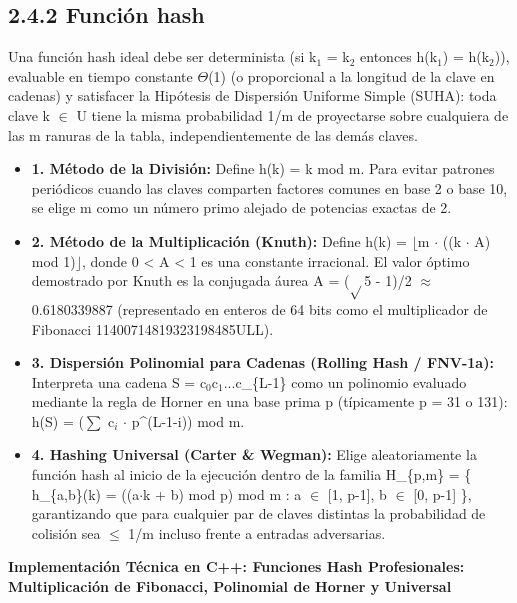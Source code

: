 \documentclass[11pt,letterpaper]{article}
\begin{document}
\subsection*{2.4.2 Función hash}
Una función hash ideal debe ser determinista (si k$_1$ = k$_2$ entonces h(k$_1$) = h(k$_2$)), evaluable en tiempo constante $\Theta$(1) (o proporcional a la longitud de la clave en cadenas) y satisfacer la Hipótesis de Dispersión Uniforme Simple (SUHA): toda clave k $\in$ U tiene la misma probabilidad 1/m de proyectarse sobre cualquiera de las m ranuras de la tabla, independientemente de las demás claves.\par
\begin{itemize}
\setlength{\itemsep}{2pt}\setlength{\parskip}{0pt}
  \item \textbf{1. Método de la División: }Define h(k) = k mod m. Para evitar patrones periódicos cuando las claves comparten factores comunes en base 2 o base 10, se elige m como un número primo alejado de potencias exactas de 2.
  \item \textbf{2. Método de la Multiplicación (Knuth): }Define h(k) = $\lfloor$m $\cdot$ ((k $\cdot$ A) mod 1)$\rfloor$, donde 0 < A < 1 es una constante irracional. El valor óptimo demostrado por Knuth es la conjugada áurea A = ($\sqrt{}$5 - 1)/2 $\approx$ 0.6180339887 (representado en enteros de 64 bits como el multiplicador de Fibonacci 11400714819323198485ULL).
  \item \textbf{3. Dispersión Polinomial para Cadenas (Rolling Hash / FNV-1a): }Interpreta una cadena S = c$_0$c$_1$...c\_\{L-1\} como un polinomio evaluado mediante la regla de Horner en una base prima p (típicamente p = 31 o 131): h(S) = ($\sum$ c$_i$ $\cdot$ p\textasciicircum{}(L-1-i)) mod m.
  \item \textbf{4. Hashing Universal (Carter \& Wegman): }Elige aleatoriamente la función hash al inicio de la ejecución dentro de la familia H\_\{p,m\} = \{ h\_\{a,b\}(k) = ((a$\cdot$k + b) mod p) mod m : a $\in$ [1, p-1], b $\in$ [0, p-1] \}, garantizando que para cualquier par de claves distintas la probabilidad de colisión sea $\le$ 1/m incluso frente a entradas adversarias.
\end{itemize}
\vspace{4pt}\noindent\textbf{\color{ipnblue}Implementación Técnica en C++: Funciones Hash Profesionales: Multiplicación de Fibonacci, Polinomial de Horner y Universal}\par\vspace{-2pt}
\end{document}
